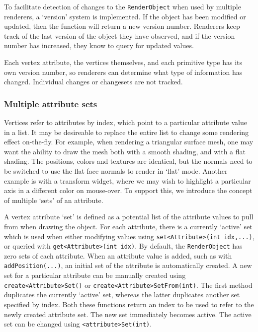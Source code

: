 \documentclass{article}
\begin{document}
To facilitate detection of changes to the \lstinline{RenderObject} when used by multiple
renderers, a `version' system is implemented.  If the object has been modified or updated,
then the function  will return a new version number.  
Renderers keep track of the last version of the object they have observed, and if the version
number has increased, they know to query for updated values.

Each vertex attribute, the vertices themselves, and each primitive type has its own version
number, so renderers can determine what type of information has changed.  Individual changes
or changesets are not tracked.

\subsubsection{Multiple attribute sets}

Vertices refer to attributes by index, which point to a particular attribute value in a list.
It may be desireable to replace the entire list to change some rendering effect
on-the-fly.  For example, when rendering a triangular surface mesh, one may want the ability
to draw the mesh both with a smooth shading, and with a flat shading.  The positions, colors
and textures are identical, but the normals need to be switched to use the flat face normals
to render in `flat' mode.  Another example is with a transform widget, where we may wish to 
highlight a particular axis in a different color on mouse-over.  To support
this, we introduce the concept of multiple `sets' of an attribute.

A vertex attribute `set' is defined as a potential list of the attribute values to pull from
when drawing the object.  For each attribute, there is a currently `active' set which is
used when either modifying values using \lstinline{set<Attribute>(int idx,...)}, or queried
with \lstinline{get<Attribute>(int idx)}.  By default, the \lstinline{RenderObject} has zero 
sets of each attribute.  When an attribute value is added, such as with \lstinline{addPosition(...)},
an initial set of the attribute is automatically created.  A new set for a particular
attribute can be manually created using \lstinline{create<Attribute>Set()} or 
\lstinline{create<Attribute>SetFrom(int)}.  The first method duplicates the currently
`active' set, whereas the latter duplicates another set specified by index.
Both these functions return an index to be used to refer to the newly created
attribute set.  The new set immediately becomes active.  The active set can be changed using
\lstinline{<attribute>Set(int)}.
\end{document}
